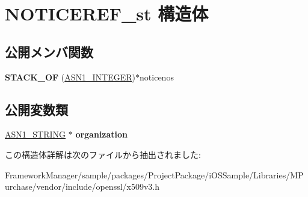 \hypertarget{struct_n_o_t_i_c_e_r_e_f__st}{}\section{N\+O\+T\+I\+C\+E\+R\+E\+F\+\_\+st 構造体}
\label{struct_n_o_t_i_c_e_r_e_f__st}
\subsection*{公開メンバ関数}
\begin{DoxyCompactItemize}
\item 
\hypertarget{struct_n_o_t_i_c_e_r_e_f__st_ab855b88346d126802c2985ec97b8b40e}{}{\bfseries S\+T\+A\+C\+K\+\_\+\+O\+F} (\hyperlink{structasn1__string__st}{A\+S\+N1\+\_\+\+I\+N\+T\+E\+G\+E\+R})$\ast$noticenos\label{struct_n_o_t_i_c_e_r_e_f__st_ab855b88346d126802c2985ec97b8b40e}

\end{DoxyCompactItemize}
\subsection*{公開変数類}
\begin{DoxyCompactItemize}
\item 
\hypertarget{struct_n_o_t_i_c_e_r_e_f__st_ada82edab12b92e7b066281582e7992cb}{}\hyperlink{structasn1__string__st}{A\+S\+N1\+\_\+\+S\+T\+R\+I\+N\+G} $\ast$ {\bfseries organization}\label{struct_n_o_t_i_c_e_r_e_f__st_ada82edab12b92e7b066281582e7992cb}

\end{DoxyCompactItemize}


この構造体詳解は次のファイルから抽出されました\+:\begin{DoxyCompactItemize}
\item 
Framework\+Manager/sample/packages/\+Project\+Package/i\+O\+S\+Sample/\+Libraries/\+M\+Purchase/vendor/include/openssl/x509v3.\+h\end{DoxyCompactItemize}
